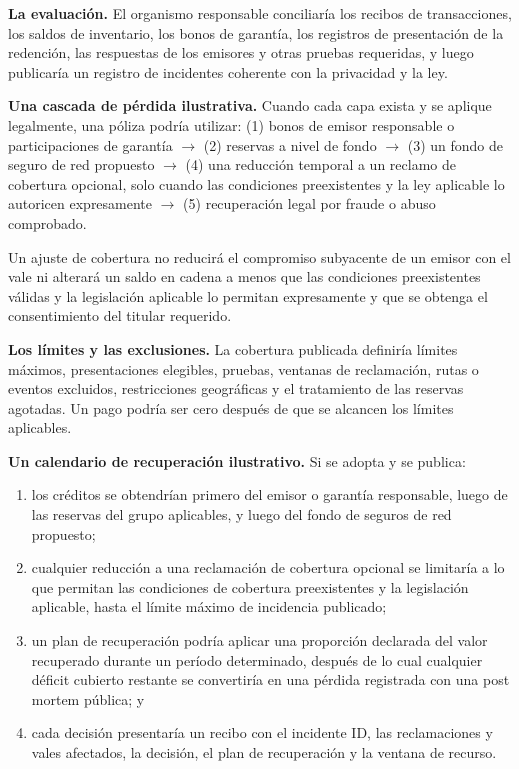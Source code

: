 \documentclass[11pt]{article}
\begin{document}
\textbf{La evaluación.} El organismo responsable conciliaría los recibos de transacciones, los saldos de inventario, los bonos de garantía, los registros de presentación de la redención, las respuestas de los emisores y otras pruebas requeridas, y luego publicaría un registro de incidentes coherente con la privacidad y la ley.

\textbf{Una cascada de pérdida ilustrativa.} Cuando cada capa exista y se aplique legalmente, una póliza podría utilizar: (1) bonos de emisor responsable o participaciones de garantía $\to$ (2) reservas a nivel de fondo $\to$ (3) un fondo de seguro de red propuesto $\to$ (4) una reducción temporal a un reclamo de cobertura opcional, solo cuando las condiciones preexistentes y la ley aplicable lo autoricen expresamente $\to$ (5) recuperación legal por fraude o abuso comprobado.

Un ajuste de cobertura no reducirá el compromiso subyacente de un emisor con el vale ni alterará un saldo en cadena a menos que las condiciones preexistentes válidas y la legislación aplicable lo permitan expresamente y que se obtenga el consentimiento del titular requerido.

\textbf{Los límites y las exclusiones.} La cobertura publicada definiría límites máximos, presentaciones elegibles, pruebas, ventanas de reclamación, rutas o eventos excluidos, restricciones geográficas y el tratamiento de las reservas agotadas. Un pago podría ser cero después de que se alcancen los límites aplicables.

\textbf{Un calendario de recuperación ilustrativo.} Si se adopta y se publica:

\begin{enumerate}[leftmargin=*]
\item los créditos se obtendrían primero del emisor o garantía responsable, luego de las reservas del grupo aplicables, y luego del fondo de seguros de red propuesto;
\item cualquier reducción a una reclamación de cobertura opcional se limitaría a lo que permitan las condiciones de cobertura preexistentes y la legislación aplicable, hasta el límite máximo de incidencia publicado;
\item un plan de recuperación podría aplicar una proporción declarada del valor recuperado durante un período determinado, después de lo cual cualquier déficit cubierto restante se convertiría en una pérdida registrada con una post mortem pública; y
\item cada decisión presentaría un recibo con el incidente ID, las reclamaciones y vales afectados, la decisión, el plan de recuperación y la ventana de recurso.
\end{enumerate}
\end{document}
